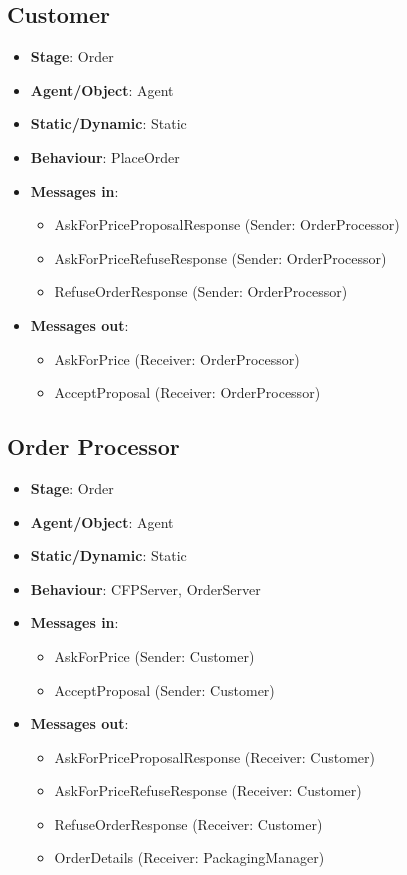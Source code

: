 \documentclass[12pt]{article}
\begin{document}
\subsection{Customer}%
\label{sub:customer_agent}
\begin{itemize}
    \item \textbf{Stage}: Order
    \item \textbf{Agent/Object}: Agent
    \item \textbf{Static/Dynamic}: Static
    \item \textbf{Behaviour}: PlaceOrder
    \item \textbf{Messages in}:
        \begin{itemize}
            \item AskForPriceProposalResponse (Sender: OrderProcessor)
            \item AskForPriceRefuseResponse (Sender: OrderProcessor)
            \item RefuseOrderResponse (Sender: OrderProcessor)
        \end{itemize}
    \item \textbf{Messages out}:
        \begin{itemize}
            \item AskForPrice (Receiver: OrderProcessor)
            \item AcceptProposal (Receiver: OrderProcessor)
        \end{itemize}
\end{itemize}

\subsection{Order Processor}%
\label{sub:order_processor}
\begin{itemize}
    \item \textbf{Stage}: Order
    \item \textbf{Agent/Object}: Agent
    \item \textbf{Static/Dynamic}: Static
    \item \textbf{Behaviour}: CFPServer, OrderServer
    \item \textbf{Messages in}:
        \begin{itemize}
            \item AskForPrice (Sender: Customer)
            \item AcceptProposal (Sender: Customer)
        \end{itemize}
    \item \textbf{Messages out}:
        \begin{itemize}
            \item AskForPriceProposalResponse (Receiver: Customer)
            \item AskForPriceRefuseResponse (Receiver: Customer)
            \item RefuseOrderResponse (Receiver: Customer)
            \item OrderDetails (Receiver: PackagingManager)
        \end{itemize}
\end{itemize}
\end{document}
